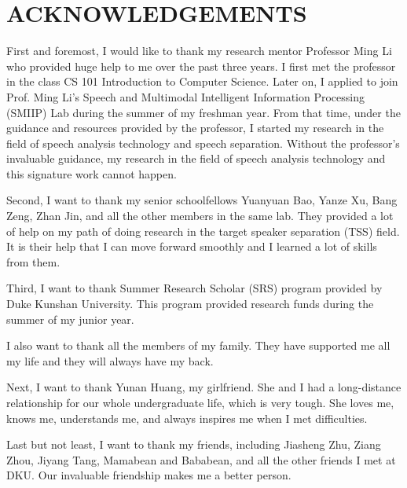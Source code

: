 

\section{ACKNOWLEDGEMENTS}\label{sec:acknowledgements}
First and foremost, I would like to thank my research mentor Professor Ming Li who provided huge help to me over the past three years.
I first met the professor in the class CS 101 Introduction to Computer Science.
Later on, I applied to join Prof. Ming Li's Speech and Multimodal Intelligent Information Processing (SMIIP) Lab during the summer of my freshman year.
From that time, under the guidance and resources provided by the professor, I started my research in the field of speech analysis technology and speech separation.
Without the professor's invaluable guidance, my research in the field of speech analysis technology and this signature work cannot happen.

Second, I want to thank my senior schoolfellows Yuanyuan Bao, Yanze Xu, Bang Zeng, Zhan Jin, and all the other members in the same lab.
They provided a lot of help on my path of doing research in the target speaker separation (TSS) field.
It is their help that I can move forward smoothly and I learned a lot of skills from them.

Third, I want to thank Summer Research Scholar (SRS) program provided by Duke Kunshan University.
This program provided research funds during the summer of my junior year.

I also want to thank all the members of my family. They have supported me all my life and they will always have my back.

Next, I want to thank Yunan Huang, my girlfriend. She and I had a long-distance relationship for our whole undergraduate life, which is very tough.
She loves me, knows me, understands me, and always inspires me when I met difficulties.

Last but not least, I want to thank my friends, including Jiasheng Zhu, Ziang Zhou, Jiyang Tang, Mamabean and Bababean, and all the other friends I met at DKU.
Our invaluable friendship makes me a better person.
